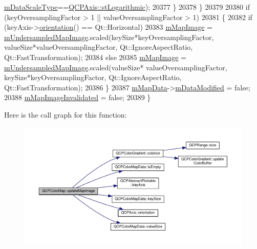\begin{DoxyCode}
      \hyperlink{class_q_c_p_color_map_ab28a4b2def408f83b9818799d5f18446}{mDataScaleType}==\hyperlink{class_q_c_p_axis_a36d8e8658dbaa179bf2aeb973db2d6f0abf5b785ad976618816dc6f79b73216d4}{QCPAxis::stLogarithmic});
20377     \}
20378   \}
20379   
20380   \textcolor{keywordflow}{if} (keyOversamplingFactor > 1 || valueOversamplingFactor > 1)
20381   \{
20382     \textcolor{keywordflow}{if} (keyAxis->\hyperlink{class_q_c_p_axis_a57483f2f60145ddc9e63f3af53959265}{orientation}() == Qt::Horizontal)
20383       \hyperlink{class_q_c_p_color_map_a66110813b42eca78b64095b2a1f285a0}{mMapImage} = \hyperlink{class_q_c_p_color_map_acad3d52f3572436d5f2e4057911ea8d3}{mUndersampledMapImage}.scaled(keySize*keyOversamplingFactor,
       valueSize*valueOversamplingFactor, Qt::IgnoreAspectRatio, Qt::FastTransformation);
20384     \textcolor{keywordflow}{else}
20385       \hyperlink{class_q_c_p_color_map_a66110813b42eca78b64095b2a1f285a0}{mMapImage} = \hyperlink{class_q_c_p_color_map_acad3d52f3572436d5f2e4057911ea8d3}{mUndersampledMapImage}.scaled(valueSize*
      valueOversamplingFactor, keySize*keyOversamplingFactor, Qt::IgnoreAspectRatio, Qt::FastTransformation);
20386   \}
20387   \hyperlink{class_q_c_p_color_map_a8709272aa8f0be3ca111bf3866806f8b}{mMapData}->\hyperlink{class_q_c_p_color_map_data_ad3cc682da2ac14e5acdbc05cf4d3d93b}{mDataModified} = \textcolor{keyword}{false};
20388   \hyperlink{class_q_c_p_color_map_ac9aea6a5c193d7fa866bc7b26e79ef2c}{mMapImageInvalidated} = \textcolor{keyword}{false};
20389 \}
\end{DoxyCode}


Here is the call graph for this function\+:\nopagebreak
\begin{figure}[H]
\begin{center}
\leavevmode
\includegraphics[width=350pt]{class_q_c_p_color_map_a5efcea591bb5486d968af520a4d43c3a_cgraph}
\end{center}
\end{figure}




